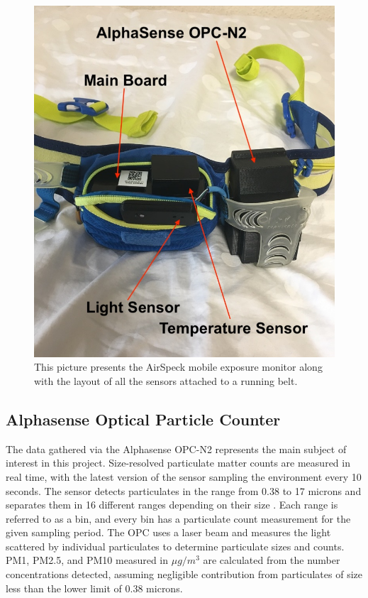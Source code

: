 \documentclass[bsc,frontabs,twoside,singlespacing,parskip,deptreport]{infthesis}     %
\begin{document}
\begin{figure}[h!]
  \center
  \includegraphics[width=\columnwidth]{airspeck.jpeg} 
  \caption{This picture presents the AirSpeck mobile exposure monitor along with the layout of all the sensors attached to a running belt.}
  \label{fig:airspeck}
\end{figure}


\subsection*{Alphasense Optical Particle Counter}

The data gathered via the Alphasense OPC-N2 \cite{opc} represents the main subject of interest in this project. Size-resolved particulate matter counts are measured in real time, with the latest version of the sensor sampling the environment every 10 seconds. The sensor detects particulates in the range from 0.38 to 17 microns and separates them in 16 different ranges depending on their size \cite{airspeck}. Each range is referred to as a bin, and every bin has a particulate count measurement for the given sampling period. The OPC uses a laser beam and measures the light scattered by individual particulates to determine particulate sizes and counts. PM1, PM2.5, and PM10 measured in $ \mu g /m^3 $ are calculated from the number concentrations detected, assuming negligible contribution from particulates of size less than the lower limit of 0.38 microns.
\end{document}
